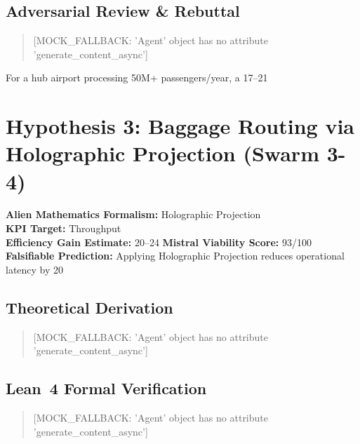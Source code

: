 \documentclass[11pt,a4paper]{report}
\begin{document}
\subsection{Adversarial Review \& Rebuttal}
\begin{quote}[MOCK_FALLBACK: 'Agent' object has no attribute 'generate_content_async']\end{quote}

\begin{tcolorbox}[colback=green!3!white,colframe=green!40!black,title=Business Impact Assessment]
For a hub airport processing 50M+ passengers/year, a 17–21%
\end{tcolorbox}
\clearpage

\section{Hypothesis 3: Baggage Routing via Holographic Projection (Swarm 3-4)}

\begin{tcolorbox}[colback=blue!3!white,colframe=blue!40!black,title=Hypothesis Overview]
\textbf{Alien Mathematics Formalism:} Holographic Projection\\
\textbf{KPI Target:} Throughput\\
\textbf{Efficiency Gain Estimate:} 20–24%
\textbf{Mistral Viability Score:} 93/100\\
\textbf{Falsifiable Prediction:} Applying Holographic Projection reduces operational latency by 20%
\end{tcolorbox}

\subsection{Theoretical Derivation}
\begin{quote}[MOCK_FALLBACK: 'Agent' object has no attribute 'generate_content_async']\end{quote}

\subsection{Lean~4 Formal Verification}
\begin{quote}[MOCK_FALLBACK: 'Agent' object has no attribute 'generate_content_async']\end{quote}
\end{document}
